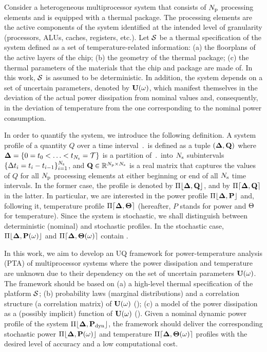
Consider a heterogeneous multiprocessor system that consists of ${N_\text{p}}$ processing elements and is equipped with a thermal package. The processing elements are the active components of the system identified at the intended level of granularity (processors, ALUs, caches, registers, etc.). Let $\mathcal{S}$ be a thermal specification of the system defined as a set of temperature-related information: (a) the floorplans of the active layers of the chip; (b) the geometry of the thermal package; (c) the thermal parameters of the materials that the chip and package are made of. In this work, $\mathcal{S}$ is assumed to be deterministic. In addition, the system depends on a set of uncertain parameters, denoted by $\mathbf{U}(\omega)$, which manifest themselves in the deviation of the actual power dissipation from nominal values and, consequently, in the deviation of temperature from the one corresponding to the nominal power consumption.

In order to quantify the system, we introduce the following definition. A system profile of a quantity $Q$ over a time interval $\period$ is defined as a tuple $(\part, \m{Q})$ where $\boldsymbol{\Delta} = \{ 0 = t_0 < \dotsc < t_{N_\text{s}} = \mathcal{T} \}$ is a partition of $\period$ into $N_\text{s}$ subintervals $\{ \Delta t_i = t_i - t_{i - 1} \}_{i = 1}^{N_\text{s}}$, and $\m{Q} \in \real^{\cores \times \steps}$ is a real matrix that captures the values of $Q$ for all ${N_\text{p}}$ processing elements at either beginning or end of all $N_\text{s}$ time intervals. In the former case, the profile is denoted by $\profB{\m{Q}}$, and by $\profE{\m{Q}}$ in the latter. In particular, we are interested in the power profile $\profP$ and, following it, temperature profile $\profT$ (hereafter, $P$ stands for power and $\Theta$ for temperature). Since the system is stochastic, we shall distinguish between deterministic (nominal) and stochastic profiles. In the stochastic case, $\profP{\o}$ and $\profT{\o}$ contain \rvs.

In this work, we aim to develop an UQ framework for power-temperature analysis (PTA) of multiprocessor systems where the power dissipation and temperature are unknown due to their dependency on the set of uncertain parameters $\mathbf{U}(\omega)$. The framework should be based on (a) a high-level thermal specification of the platform $\mathcal{S}$; (b) probability laws (marginal distributions) and a correlation structure (a correlation matrix) of $\mathbf{U}(\omega)$ (); (c) a model of the power dissipation as a (possibly implicit) function of $\mathbf{U}(\omega)$ (). Given a nominal dynamic power profile of the system $\profPdyn$, the framework should deliver the corresponding stochastic power $\profP{\o}$ and temperature $\profT{\o}$ profiles with the desired level of accuracy and a low computational cost.
